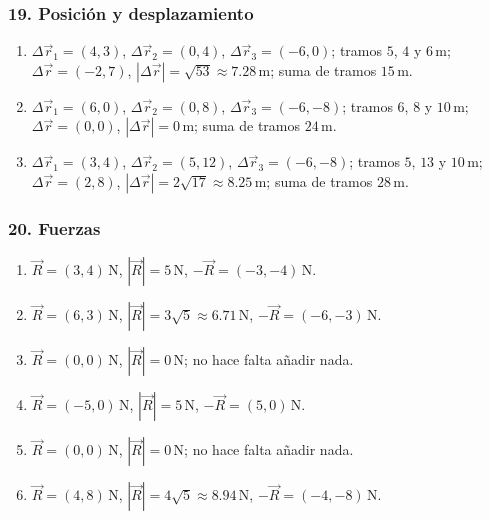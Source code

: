 \subsubsection*{19. Posición y desplazamiento}
\begin{enumerate}
    \item[a)]
    $\Delta\vec{r}_1=(4,3)$,
    $\Delta\vec{r}_2=(0,4)$,
    $\Delta\vec{r}_3=(-6,0)$;
    tramos $5$, $4$ y $6\,\mathrm{m}$;
    $\Delta\vec{r}=(-2,7)$,
    $|\Delta\vec{r}|=\sqrt{53}\approx7.28\,\mathrm{m}$;
    suma de tramos $15\,\mathrm{m}$.

    \item[b)]
    $\Delta\vec{r}_1=(6,0)$,
    $\Delta\vec{r}_2=(0,8)$,
    $\Delta\vec{r}_3=(-6,-8)$;
    tramos $6$, $8$ y $10\,\mathrm{m}$;
    $\Delta\vec{r}=(0,0)$,
    $|\Delta\vec{r}|=0\,\mathrm{m}$;
    suma de tramos $24\,\mathrm{m}$.

    \item[c)]
    $\Delta\vec{r}_1=(3,4)$,
    $\Delta\vec{r}_2=(5,12)$,
    $\Delta\vec{r}_3=(-6,-8)$;
    tramos $5$, $13$ y $10\,\mathrm{m}$;
    $\Delta\vec{r}=(2,8)$,
    $|\Delta\vec{r}|=2\sqrt{17}\approx8.25\,\mathrm{m}$;
    suma de tramos $28\,\mathrm{m}$.
\end{enumerate}

\subsubsection*{20. Fuerzas}
\begin{enumerate}
    \item[a)] $\vec{R}=(3,4)\,\mathrm{N}$,
    $|\vec{R}|=5\,\mathrm{N}$,
    $-\vec{R}=(-3,-4)\,\mathrm{N}$.

    \item[b)] $\vec{R}=(6,3)\,\mathrm{N}$,
    $|\vec{R}|=3\sqrt{5}\approx6.71\,\mathrm{N}$,
    $-\vec{R}=(-6,-3)\,\mathrm{N}$.

    \item[c)] $\vec{R}=(0,0)\,\mathrm{N}$,
    $|\vec{R}|=0\,\mathrm{N}$; no hace falta añadir nada.

    \item[d)] $\vec{R}=(-5,0)\,\mathrm{N}$,
    $|\vec{R}|=5\,\mathrm{N}$,
    $-\vec{R}=(5,0)\,\mathrm{N}$.

    \item[e)] $\vec{R}=(0,0)\,\mathrm{N}$,
    $|\vec{R}|=0\,\mathrm{N}$; no hace falta añadir nada.

    \item[f)] $\vec{R}=(4,8)\,\mathrm{N}$,
    $|\vec{R}|=4\sqrt{5}\approx8.94\,\mathrm{N}$,
    $-\vec{R}=(-4,-8)\,\mathrm{N}$.
\end{enumerate}

